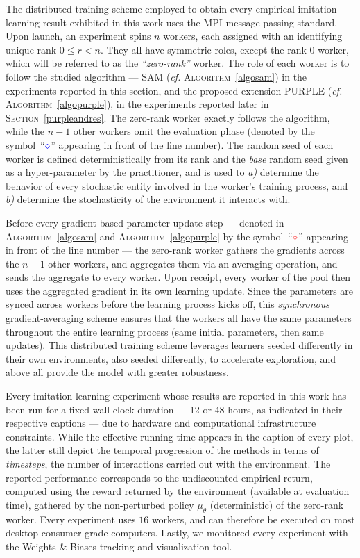 The distributed training scheme employed to obtain every empirical imitation learning result
exhibited in this work uses the MPI message-passing standard.
Upon launch, an experiment spins $n$ workers,
each assigned with an identifying unique rank $0 \leq r < n$.
They all have symmetric roles, except the rank $0$ worker,
which will be referred to as the \textit{``zero-rank''} worker.
The role of each worker is to follow the studied algorithm ---
SAM (\textit{cf.} \textsc{Algorithm}~\ref{algosam})
in the experiments reported in this section, and the proposed extension
PURPLE (\textit{cf.} \textsc{Algorithm}~\ref{algopurple}),
in the experiments reported later
in \textsc{Section}~\ref{purpleandres}.
The zero-rank worker exactly follows the algorithm, while
the $n-1$ other workers omit
the evaluation phase (denoted by the symbol~``$\textcolor{blue}{\diamond}$'' appearing
in front of the line number).
The random seed of each worker is defined deterministically from its rank
and the \textit{base} random seed given as a hyper-parameter by the practitioner,
and is used to \textit{a)} determine the behavior of every stochastic entity involved in
the worker's training process,
and \textit{b)} determine the stochasticity of the environment it interacts with.

Before every gradient-based parameter update step
--- denoted in \textsc{Algorithm}~\ref{algosam} and \textsc{Algorithm}~\ref{algopurple}
by the symbol~``$\textcolor{red}{\diamond}$'' appearing
in front of the line number ---
the zero-rank worker gathers the gradients across the $n-1$ other workers,
and aggregates them via an averaging operation,
and sends the aggregate to every worker.
Upon receipt, every worker of the pool then uses the aggregated gradient
in its own learning update.
Since the parameters are synced across workers before the learning process kicks off,
this \emph{synchronous} gradient-averaging scheme
ensures that the workers all have the same parameters
throughout the entire learning process (same initial parameters, then same updates).
This distributed training scheme leverages learners seeded differently in their own
environments, also seeded differently, to accelerate exploration, and above all
provide the model with greater robustness.

Every imitation learning experiment whose results are reported in this work
has been run for a fixed wall-clock duration
--- 12 or 48 hours, as indicated in their respective captions ---
due to hardware and computational infrastructure constraints.
While the effective running time appears in the caption of every plot,
the latter still depict the temporal progression of the methods in terms of \emph{timesteps},
the number of interactions carried out with the environment.
The reported performance corresponds to the undiscounted empirical return,
computed using the reward returned by the environment (available at evaluation time),
gathered by the non-perturbed policy $\mu_\theta$ (deterministic) of the zero-rank worker.
Every experiment uses $16$ workers,
and can therefore be executed on most desktop consumer-grade computers.
Lastly, we monitored every experiment with the Weights \& Biases \cite{Biewald2020-wb} tracking and visualization tool.

